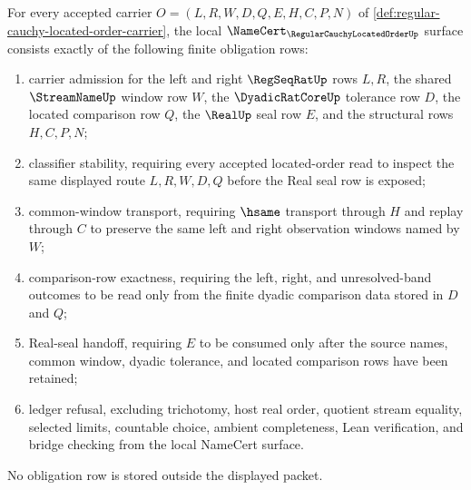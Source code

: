 \begin{theorem}
\label{thm:regular-cauchy-located-order-namecert-obligations}
For every accepted carrier $O=(L,R,W,D,Q,E,H,C,P,N)$ of \autoref{def:regular-cauchy-located-order-carrier}, the local $\NameCert_{\RegularCauchyLocatedOrderUp}$ surface consists exactly of the following finite obligation rows:
\begin{enumerate}
\item carrier admission for the left and right $\RegSeqRatUp$ rows $L,R$, the shared $\StreamNameUp$ window row $W$, the $\DyadicRatCoreUp$ tolerance row $D$, the located comparison row $Q$, the $\RealUp$ seal row $E$, and the structural rows $H,C,P,N$;
\item classifier stability, requiring every accepted located-order read to inspect the same displayed route $L,R,W,D,Q$ before the Real seal row is exposed;
\item common-window transport, requiring $\hsame$ transport through $H$ and replay through $C$ to preserve the same left and right observation windows named by $W$;
\item comparison-row exactness, requiring the left, right, and unresolved-band outcomes to be read only from the finite dyadic comparison data stored in $D$ and $Q$;
\item Real-seal handoff, requiring $E$ to be consumed only after the source names, common window, dyadic tolerance, and located comparison rows have been retained;
\item ledger refusal, excluding trichotomy, host real order, quotient stream equality, selected limits, countable choice, ambient completeness, Lean verification, and bridge checking from the local NameCert surface.
\end{enumerate}
No obligation row is stored outside the displayed packet.
\end{theorem}
